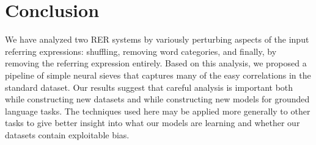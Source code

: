 \documentclass[11pt,a4paper]{article}
\begin{document}
\section{Conclusion} \label{sec:conclusion}
\vspace{-5pt}
We have analyzed two RER systems by variously perturbing aspects of the input referring expressions: shuffling, removing word categories, and finally, by removing the referring expression entirely.
Based on this analysis, we proposed a pipeline of simple neural sieves that captures many of the easy correlations in the standard dataset.
Our results suggest that careful analysis is important both while constructing new datasets and while constructing new models for grounded language tasks. The techniques used here may be applied more generally to other tasks to give better insight into what our models are learning and whether our datasets contain exploitable bias.


\end{document}
